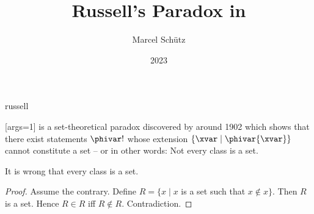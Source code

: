 \documentclass{stex}
\begin{document}
\title{Russell's Paradox in \Naproche}
\author{Marcel Schütz}
\date{2023}
\maketitle
\begin{smodule}{russell}
\begin{sparagraph}
  [args=1]{\maincomp{\varphi}}
  \emph{} is a set-theoretical paradox discovered by  around 1902 \cite[chapter XV]{Frege1980} which shows that there exist statements $\phivar!$ whose extension $\{\xvar\mid\phivar{\xvar}\}$ cannot constitute a set – or in other words: Not every class is a set.
\end{sparagraph}

\begin{forthel}

  \begin{theorem*}\label{russell_paradox}
    It is wrong that every class is a set.
  \end{theorem*}
  \begin{proof}
    Assume the contrary.
    Define $R = \{ x \mid x$ is a set such that $x \notin x \}$.
    Then $R$ is a set.
    Hence $R \in R$ iff $R \notin R$.
    Contradiction.
  \end{proof}
\end{forthel}
\end{smodule}
\printbibliography
\end{document}
